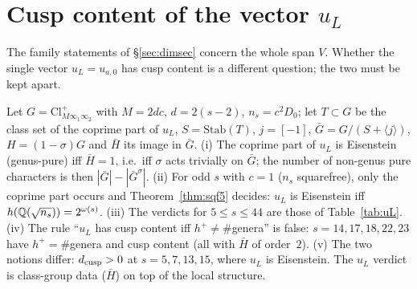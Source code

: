\section{Cusp content of the vector $u_L$}\label{sec:uL}
The family statements of \S\ref{sec:dimsec} concern the whole span $V$. Whether the single vector $u_L=u_{a,0}$ has cusp content is a different question; the two must be kept apart.
\begin{proposition}\label{prop:cuspcrit}
Let $G=\mathrm{Cl}^+_{M\infty_1\infty_2}$ with $M=2dc$, $d=2(s-2)$, $n_s=c^2D_0$; let $T\subset G$ be the class set of the coprime part of $u_L$, $S=\mathrm{Stab}(T)$,
$j=[-1]$, $\bar G=G/(S+\langle j\rangle)$, $H=(1-\sigma)G$ and $\bar H$ its image in $\bar G$.
(i) The coprime part of $u_L$ is Eisenstein (genus-pure) iff $\bar H=1$, i.e.\ iff $\sigma$ acts trivially on $\bar G$; the number of non-genus pure characters is
then $|\bar G|-|\bar G^\sigma|$.
(ii) For odd $s$ with $c=1$ ($n_s$ squarefree), only the coprime part occurs and Theorem~\ref{thm:sqf5} decides: $u_L$ is Eisenstein iff
$h(\mathbb{Q}(\sqrt{n_s}))=2^{\omega(s)}$.
(iii) The verdicts for $5\le s\le44$ are those of Table~\ref{tab:uL}.
(iv) The rule ``$u_L$ has cusp content iff $h^+\neq\#$genera'' is false: $s=14,17,18,22,23$ have $h^+=\#$genera and cusp content (all with $\bar H$ of order~$2$).
(v) The two notions differ: $d_{\rm cusp}>0$ at $s=5,7,13,15$, where $u_L$ is Eisenstein. The $u_L$ verdict is class-group data ($\bar H$) on top of the local structure.
\end{proposition}

